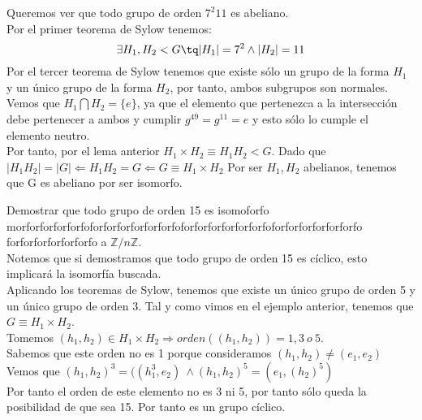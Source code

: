 \documentclass[nochap]{apuntes}
\begin{document}
 \begin{example}
  Queremos ver que todo grupo de orden $7^{2}11$  es abeliano.\\
  Por el primer teorema de Sylow tenemos: \\
  \[\exists H_1, H_2 <G \tq |H_1|=7^{2} \wedge |H_2|=11\]
  Por el tercer teorema de Sylow tenemos que existe sólo un grupo de la forma $H_1$  y un único grupo de la forma $H_2$, por tanto,
  ambos subgrupos son normales.\\
  Vemos que $H_1 \bigcap H_2 = \{e\}$, ya que el elemento que pertenezca a la intersección debe pertenecer a ambos y cumplir $g^49=g^11=e$
  y esto sólo lo cumple el elemento neutro.\\
  Por tanto, por el lema anterior $H_1\times H_2 \equiv H_1H_2 < G$. Dado que $|H_1H_2|=|G| \Leftarrow H_1H_2=G \Leftarrow G \equiv H_1 \times H_2$
  Por ser $H_1, H_2$  abelianos, tenemos que G es abeliano por ser isomorfo.
  \end{example}

  \begin{example}
   Demostrar que todo grupo de orden 15 es isomoforfo morforforforforfo{\large forforforforforforfo{\LARGE forforforforforforfo{\huge forforforforforforfo {\Huge forforforforforforfo}}}} %
   a $\mathbb{Z}/n\mathbb{Z}$.\\
   Notemos que si demostramos que todo grupo de orden 15 es cíclico, esto implicará la isomorfía buscada.\\
   Aplicando los teoremas de Sylow, tenemos que existe un único grupo de orden 5 y un único grupo de orden 3. Tal y como vimos en el
   ejemplo anterior, tenemos que $G\equiv H_1\times H_2$.\\
   Tomemos $(h_1, h_2)\in H_1 \times H_2 \Rightarrow orden((h_1, h_2))=1,3\ o \ 5$.\\
   Sabemos que este orden no es 1 porque consideramos  $(h_1, h_2)\neq (e_1, e_2)$\\
   Vemos que $(h_1, h_2)^{3}=((h_1^{3}, e_2) \ \wedge (h_1, h_2)^{5}=(e_1, (h_2)^{5})$\\
   Por tanto el orden de este elemento no es 3 ni 5, por tanto sólo queda la posibilidad de que sea 15. Por tanto es un grupo cíclico.
  \end{example}
\end{document}
